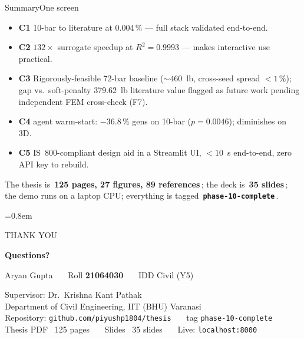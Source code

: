 \documentclass[aspectratio=169]{beamer}
\newcommand{\pillblue}[1]{\colorbox{accent!12}{\textcolor{accent}{\footnotesize\bfseries\,#1\,}}}
\begin{document}
\begin{frame}{Summary}{One screen}
  \small
  \begin{itemize}
    \item \textbf{C1} 10-bar to literature at $\num{0.004}\,\%$ --- full stack validated end-to-end.
    \item \textbf{C2} $132\times$ surrogate speedup at $R^2 = 0.9993$ --- makes interactive use practical.
    \item \textbf{C3} Rigorously-feasible 72-bar baseline (${\sim}460$~lb, cross-seed spread ${<}1\,\%$); gap vs.\ soft-penalty 379.62~lb literature value flagged as future work pending independent FEM cross-check (F7).
    \item \textbf{C4} agent warm-start: $-36.8\,\%$ gens on 10-bar ($p=0.0046$); diminishes on 3D.
    \item \textbf{C5} IS~800-compliant design aid in a Streamlit UI, $<10$~s end-to-end, zero API key to rebuild.
  \end{itemize}
  \vspace{0.4em}
  The thesis is \pillblue{125 pages, 27 figures, 89 references}; the deck is \pillblue{35 slides}; the demo runs on a laptop CPU; everything is tagged \pillblue{\texttt{phase-10-complete}}.
\end{frame}

\begin{frame}[plain]
  \vspace*{1.6cm}
  \begin{minipage}{\linewidth}\raggedright\leftskip=0.8em
    {\fontsize{10}{12}\selectfont\color{inkmuted}\MakeUppercase{Thank you}\par}
    \vspace{0.8em}
    {\fontsize{36}{40}\selectfont\bfseries\color{ink}Questions?\par}
    \vspace{1.8em}
    {\fontsize{12}{16}\selectfont\color{ink}%
      Aryan Gupta \ \textbullet\ \ Roll \textbf{21064030} \ \textbullet\ \ IDD Civil (Y5)\par}
    {\fontsize{11}{14}\selectfont\color{inkmuted}%
      Supervisor: Dr.~Krishna Kant Pathak\\
      Department of Civil Engineering, IIT (BHU) Varanasi\\[0.5em]
      Repository: \texttt{github.com/piyushp1804/thesis} \ \textbullet\ \ tag \texttt{phase-10-complete}\\
      Thesis PDF \textendash\ 125 pages \ \textbullet\ \ Slides \textendash\ 35 slides \ \textbullet\ \ Live: \texttt{localhost:8000}\par}
  \end{minipage}
\end{frame}
\end{document}
